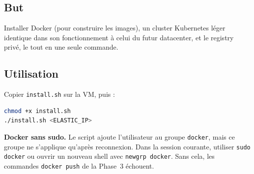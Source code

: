 \documentclass[12pt,a4paper]{article}
\begin{document}
\subsection{But}
Installer Docker (pour construire les images), un cluster Kubernetes léger identique dans son fonctionnement à celui du futur datacenter, et le registry privé, le tout en une seule commande.

\subsection{Utilisation}
Copier \texttt{install.sh} sur la VM, puis :
\begin{lstlisting}[language=bash]
chmod +x install.sh
./install.sh <ELASTIC_IP>
\end{lstlisting}

\textbf{Docker sans sudo.} Le script ajoute l'utilisateur au groupe \texttt{docker}, mais ce groupe ne s'applique qu'après reconnexion. Dans la session courante, utiliser \texttt{sudo docker} ou ouvrir un nouveau shell avec \texttt{newgrp docker}. Sans cela, les commandes \texttt{docker push} de la Phase~3 échouent.
\end{document}
